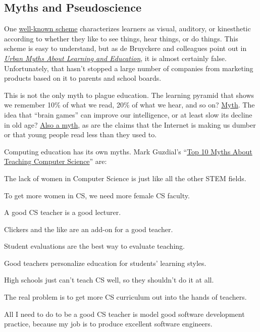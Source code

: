 \subsection{Myths and Pseudoscience}\label{myths-and-pseudoscience}

One
\href{https://en.wikipedia.org/wiki/Learning_styles\#Learning_modalities}{well-known
scheme} characterizes learners as visual, auditory, or kinesthetic
according to whether they like to see things, hear things, or do things.
This scheme is easy to understand, but as de Bruyckere and colleagues
point out in
\emph{\href{https://www.amazon.com/Urban-Myths-about-Learning-Education/dp/0128015373/}{Urban
Myths About Learning and Education}}, it is almost certainly false.
Unfortunately, that hasn't stopped a large number of companies from
marketing products based on it to parents and school boards.

This is not the only myth to plague education. The learning pyramid that
shows we remember 10\% of what we read, 20\% of what we hear, and so on?
\href{https://www.amazon.com/Urban-Myths-about-Learning-Education/dp/0128015373/}{Myth}.
The idea that ``brain games'' can improve our intelligence, or at least
slow its decline in old age?
\href{https://www.amazon.com/Urban-Myths-about-Learning-Education/dp/0128015373/}{Also
a myth}, as are the claims that the Internet is making us dumber or that
young people read less than they used to.

Computing education has its own myths. Mark Guzdial's
``\href{\{\{\%20page.root\%20\}\}/files/papers/guzdial-10-myths-2015.pdf}{Top
10 Myths About Teaching Computer Science}'' are:

The lack of women in Computer Science is just like all the other STEM
fields.

To get more women in CS, we need more female CS faculty.

A good CS teacher is a good lecturer.

Clickers and the like are an add-on for a good teacher.

Student evaluations are the best way to evaluate teaching.

Good teachers personalize education for students' learning styles.

High schools just can't teach CS well, so they shouldn't do it at all.

The real problem is to get more CS curriculum out into the hands of
teachers.

All I need to do to be a good CS teacher is model good software
development practice, because my job is to produce excellent software
engineers.

